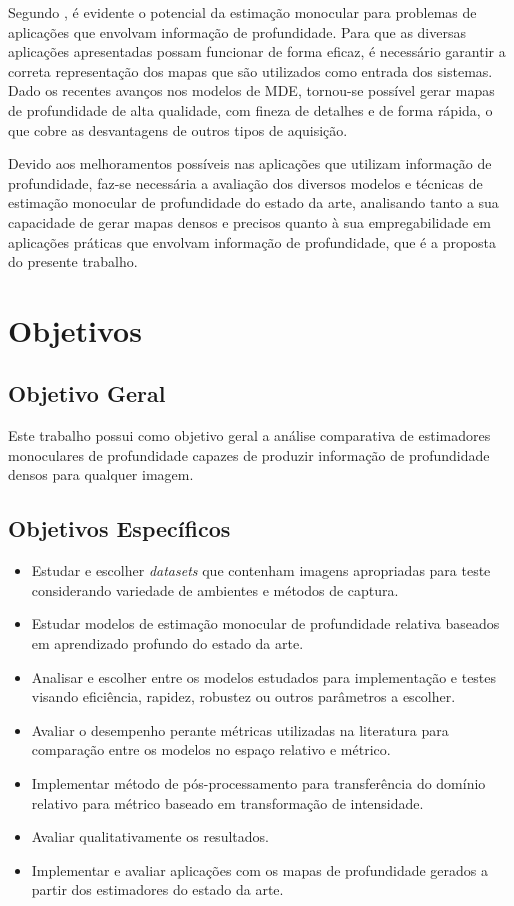 Segundo , é evidente o potencial da estimação monocular para problemas de aplicações que envolvam informação de profundidade. Para que as diversas aplicações apresentadas possam funcionar de forma eficaz, é necessário garantir a correta representação dos mapas que são utilizados como entrada dos sistemas. Dado os recentes avanços nos modelos de MDE, tornou-se possível gerar mapas de profundidade de alta qualidade, com fineza de detalhes e de forma rápida, o que cobre as desvantagens de outros tipos de aquisição. 

Devido aos melhoramentos possíveis nas aplicações que utilizam informação de profundidade, faz-se necessária a avaliação dos diversos modelos e técnicas de estimação monocular de profundidade do estado da arte, analisando tanto a sua capacidade de gerar mapas densos e precisos quanto à sua empregabilidade em aplicações práticas que envolvam informação de profundidade, que é a proposta do presente trabalho.

 
\section{Objetivos}


\subsection{Objetivo Geral}
Este trabalho possui como objetivo geral a análise comparativa de estimadores monoculares de profundidade capazes de produzir informação de profundidade densos para qualquer imagem.

\subsection{Objetivos Específicos}

\begin{itemize}
    \item Estudar e escolher \textit{datasets} que contenham imagens apropriadas para teste considerando variedade de ambientes e métodos de captura.
    \item Estudar modelos de estimação monocular de profundidade relativa baseados em aprendizado profundo do estado da arte.
    \item Analisar e escolher entre os modelos estudados para implementação e testes visando eficiência, rapidez, robustez ou outros parâmetros a escolher.
    \item Avaliar o desempenho perante métricas utilizadas na literatura para comparação entre os modelos no espaço relativo e métrico.
    \item Implementar método de pós-processamento para transferência do domínio relativo para métrico baseado em transformação de intensidade.
    \item Avaliar qualitativamente os resultados.
    \item Implementar e avaliar aplicações com os mapas de profundidade gerados a partir dos estimadores do estado da arte.
    
\end{itemize}



